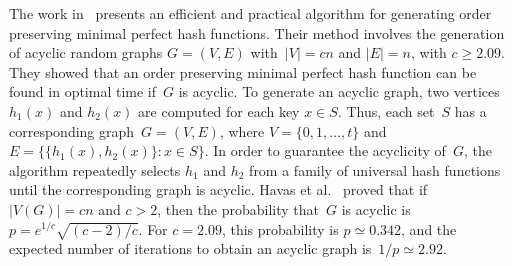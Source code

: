 The work in~\cite{chm92} presents an efficient and practical algorithm
for generating order preserving minimal perfect hash functions.
Their method involves the generation of acyclic random graphs
$G = (V, E)$ with~$|V|=cn$ and $|E|=n$, with  $c \ge 2.09$.
They showed that an order preserving minimal perfect hash function
can be found in optimal time if~$G$ is acyclic.
To generate an acyclic graph, two vertices $h_1(x)$ and $h_2(x)$ are
computed for each key $x \in S$.
Thus, each set~$S$ has a corresponding graph~$G=(V,E)$, where $V=\{0,1,
\ldots,t\}$ and $E=\big\{\{h_1(x),h_2(x)\}:x \in S\big\}$.
In order to guarantee the acyclicity of~$G$, the algorithm repeatedly selects
$h_1$ and $h_2$ from a family of universal hash functions
until the corresponding graph is acyclic.
Havas et al.~\cite{hmwc93} proved that if $|V(G)|=cn$ and $c>2$,
then the probability that~$G$ is acyclic is $p=e^{1/c}\sqrt{(c-2)/c}$.
For $c=2.09$, this probability is
$p \simeq 0.342$, and
the expected number of iterations to obtain an acyclic graph
is~$1/p \simeq 2.92$.